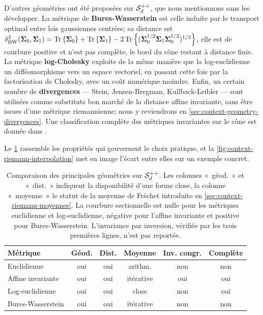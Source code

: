 D'autres géométries ont été proposées sur $\mathcal{S}_{d}^{++}$, que nous mentionnons sans les développer. La métrique de \textbf{Bures-Wasserstein}  est celle induite par le transport optimal entre lois gaussiennes centrées; sa distance est $\delta^2_{\mathrm{BW}}(\boldsymbol{\Sigma}_0,\boldsymbol{\Sigma}_1)=\operatorname{\operatorname{Tr}}\left\{\boldsymbol{\Sigma}_0\right\}+\operatorname{\operatorname{Tr}}\left\{\boldsymbol{\Sigma}_1\right\}-2\operatorname{\operatorname{Tr}}\left\{(\boldsymbol{\Sigma}_0^{1/2}\boldsymbol{\Sigma}_1\boldsymbol{\Sigma}_0^{1/2})^{1/2}\right\}$, elle est de courbure positive et n'est pas complète, le bord du cône restant à distance finie. La métrique \textbf{log-Cholesky} exploite de la même manière que la log-euclidienne un difféomorphisme vers un espace vectoriel, en passant cette fois par la factorisation de Cholesky, avec un coût numérique moindre. Enfin, un certain nombre de \textbf{divergences} --- Stein, Jensen-Bregman, Kullback-Leibler --- sont utilisées comme substituts bon marché de la distance affine invariante, sans être issues d'une métrique riemannienne; nous y reviendrons en \cref{sec:context-geometry-divergences}. Une classification complète des métriques invariantes sur le cône est donnée dans .

Le \cref{tab:context-riemann-metriques} rassemble les propriétés qui gouvernent le choix pratique, et la \cref{fig:context-riemann-interpolation} met en image l'écart entre elles sur un exemple concret.

\begin{table}
  \centering
  \footnotesize
  \begin{tabular}{@{}lccccc@{}}
    \toprule
    Métrique & Géod. & Dist. & Moyenne & Inv. congr. & Complète \\
    \midrule
    Euclidienne          & oui & oui & arithm.   & non & non \\
    Affine invariante    & oui & oui & itérative & oui & oui \\
    Log-euclidienne      & oui & oui & close     & non & oui \\
    Bures-Wasserstein    & oui & oui & itérative & non & non \\
    \bottomrule
  \end{tabular}
  \vspace{0.5em}
  \caption{Comparaison des principales géométries sur $\mathcal{S}_{d}^{++}$. Les colonnes «~géod.~» et «~dist.~» indiquent la disponibilité d'une forme close, la colonne «~moyenne~» le statut de la moyenne de Fréchet introduite en \cref{sec:context-riemann-moyennes}. La courbure sectionnelle est nulle pour les métriques euclidienne et log-euclidienne, négative pour l'affine invariante et positive pour Bures-Wasserstein. L'invariance par inversion, vérifiée par les trois premières lignes, n'est pas reportée.}
  \label{tab:context-riemann-metriques}
\end{table}

